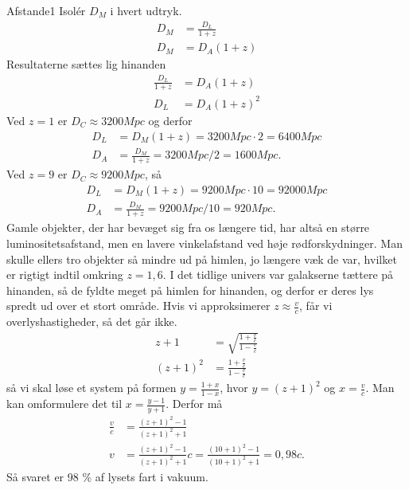 \begin{opgave}{Afstande}{1}
	\opg Isolér $D_M$ i hvert udtryk.
	\begin{align}
		D_M &= \frac{D_L}{1+z}\\
		D_M &= D_A(1+z)
	\end{align}
	Resultaterne sættes lig hinanden
		\begin{align}
		\frac{D_L}{1+z} &= D_A(1+z)\\
		D_L &= D_A (1+z)^2
		\end{align}
	\opg Ved $z=1$ er $D_C\approx3200 Mpc$ og derfor
	\begin{align}
		D_L &= D_M(1+z)= 3200 Mpc \cdot 2 = 6400 Mpc\\
		D_A &= \frac{D_M}{1+z}= 3200 Mpc/ 2 = 1600 Mpc.
	\end{align}
	Ved $z=9$ er $D_C\approx9200 Mpc$, så
	\begin{align}
		D_L &= D_M(1+z)= 9200 Mpc \cdot 10 = 92000 Mpc\\
		D_A &= \frac{D_M}{1+z}= 9200 Mpc/ 10 = 920 Mpc.
	\end{align}
	Gamle objekter, der har bevæget sig fra os længere tid, har altså en større luminositetsafstand, men en lavere vinkelafstand ved høje rødforskydninger. Man skulle ellers tro objekter så mindre ud på himlen, jo længere væk de var, hvilket er rigtigt indtil omkring $z=1,6$. I det tidlige univers var galakserne tættere på hinanden, så de fyldte meget på himlen for hinanden, og derfor er deres lys spredt ud over et stort område.
	\opg
	Hvis vi approksimerer $z\approx\frac{v}{c}$, får vi overlyshastigheder, så det går ikke.
	\begin{align}
	z+1&=\sqrt{\frac{1+\frac{v}{c}}{1-\frac{v}{c}}}\\
	(z+1)^2&=\frac{1+\frac{v}{c}}{1-\frac{v}{c}}
	\end{align}
	så vi skal løse et system på formen $y=\frac{1+x}{1-x}$, hvor $y=(z+1)^2$ og $x=\frac{v}{c}$. Man kan omformulere det til $x=\frac{y-1}{y+1}$. Derfor må
	\begin{align}
	\frac{v}{c}&=\frac{(z+1)^2-1}{(z+1)^2+1}\\
	v&=\frac{(z+1)^2-1}{(z+1)^2+1} c = \frac{(10+1)^2-1}{(10+1)^2+1} = 0,98 c. %
	\end{align}
	Så svaret er 98 \% af lysets fart i vakuum.
\end{opgave}
